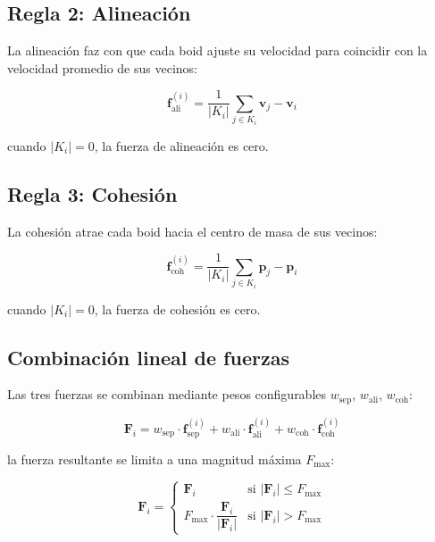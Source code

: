 \documentclass[11pt,a4paper]{article}
\begin{document}
\subsection{Regla 2: Alineación}
\label{sec:alineacion}

La alineación faz con que cada boid ajuste su velocidad para coincidir con la velocidad promedio de sus vecinos:

\begin{equation}
  \mathbf{f}_{\text{ali}}^{(i)} = \frac{1}{|K_i|} \sum_{j \in K_i} \mathbf{v}_j - \mathbf{v}_i
  \label{eq:alineacion}
\end{equation}

\noindent cuando $|K_i| = 0$, la fuerza de alineación es cero.

\subsection{Regla 3: Cohesión}
\label{sec:cohesion}

La cohesión atrae cada boid hacia el centro de masa de sus vecinos:

\begin{equation}
  \mathbf{f}_{\text{coh}}^{(i)} = \frac{1}{|K_i|} \sum_{j \in K_i} \mathbf{p}_j - \mathbf{p}_i
  \label{eq:cohesion}
\end{equation}

\noindent cuando $|K_i| = 0$, la fuerza de cohesión es cero.

\subsection{Combinación lineal de fuerzas}
\label{sec:combinacion}

Las tres fuerzas se combinan mediante pesos configurables $w_{\text{sep}}$, $w_{\text{ali}}$, $w_{\text{coh}}$:

\begin{equation}
  \mathbf{F}_i = w_{\text{sep}} \cdot \mathbf{f}_{\text{sep}}^{(i)} + w_{\text{ali}} \cdot \mathbf{f}_{\text{ali}}^{(i)} + w_{\text{coh}} \cdot \mathbf{f}_{\text{coh}}^{(i)}
  \label{eq:combinacion}
\end{equation}

\noindent la fuerza resultante se limita a una magnitud máxima $F_{\text{max}}$:

\begin{equation}
  \mathbf{F}_i = \begin{cases}
    \mathbf{F}_i & \text{si } |\mathbf{F}_i| \leq F_{\text{max}} \\
    F_{\text{max}} \cdot \dfrac{\mathbf{F}_i}{|\mathbf{F}_i|} & \text{si } |\mathbf{F}_i| > F_{\text{max}}
  \end{cases}
  \label{eq:limitar}
\end{equation}
\end{document}
